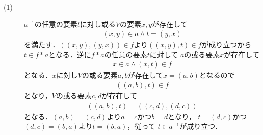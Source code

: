 	\begin{screen}
		\begin{thm}
			
		\end{thm}
	\end{screen}
	
	\begin{prf}\mbox{}
		\begin{description}
			\item[(1)] $a^{-1}$の任意の要素$t$に対し或る$V$の要素$x,y$が存在して
				\begin{align}
					(x,y) \in a \wedge t = (y,x)
				\end{align}
				を満たす．$((x,y),(y,x)) \in f$より$((x,y),t) \in f$が成り立つから
				$t \in f \ast a$となる．逆に$f \ast a$の任意の要素$t$に対して
				$a$の或る要素$x$が存在して
				\begin{align}
					x \in a \wedge (x,t) \in f
				\end{align}
				となる．$x$に対し$V$の或る要素$a,b$が存在して$x=(a,b)$となるので
				\begin{align}
					((a,b),t) \in f
				\end{align}
				となり，$V$の或る要素$c,d$が存在して
				\begin{align}
					((a,b),t) = ((c,d),(d,c))
				\end{align}
				となる．$(a,b) = (c,d)$より$a=c$かつ$b=d$となり，
				$t = (d,c)$かつ$(d,c)=(b,a)$より$t=(b,a)$，従って
				$t \in a^{-1}$が成り立つ．
		\end{description}
	\end{prf}